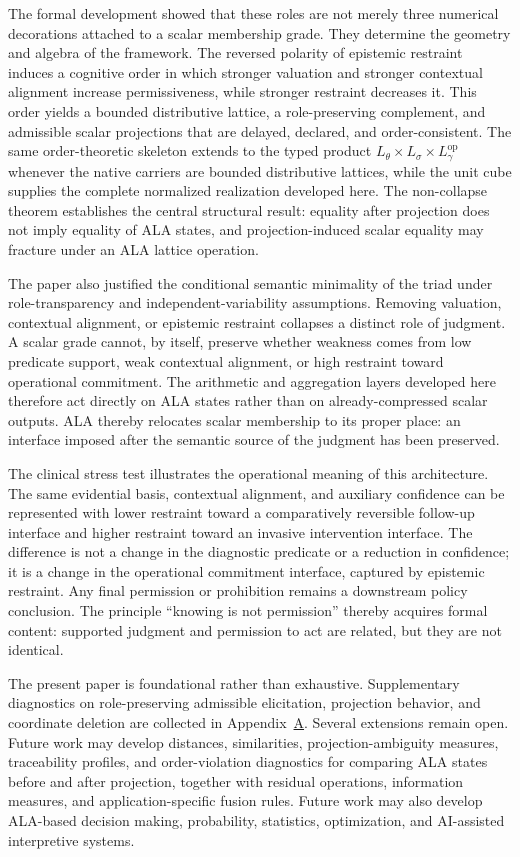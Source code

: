 \documentclass[reqno,final]{amsart}
\theoremstyle{definition}
\theoremstyle{plain}
\theoremstyle{remark}
\begin{document}
The formal development showed that these roles are not merely three numerical decorations attached to a scalar membership grade. They determine the geometry and algebra of the framework. The reversed polarity of epistemic restraint induces a cognitive order in which stronger valuation and stronger contextual alignment increase permissiveness, while stronger restraint decreases it. This order yields a bounded distributive lattice, a role-preserving complement, and admissible scalar projections that are delayed, declared, and order-consistent. The same order-theoretic skeleton extends to the typed product \(L_\theta\times L_\sigma\times L_\gamma^{\mathrm{op}}\) whenever the native carriers are bounded distributive lattices, while the unit cube supplies the complete normalized realization developed here. The non-collapse theorem establishes the central structural result: equality after projection does not imply equality of ALA states, and projection-induced scalar equality may fracture under an ALA lattice operation.

The paper also justified the conditional semantic minimality of the triad under role-transparency and independent-variability assumptions. Removing valuation, contextual alignment, or epistemic restraint collapses a distinct role of judgment. A scalar grade cannot, by itself, preserve whether weakness comes from low predicate support, weak contextual alignment, or high restraint toward operational commitment. The arithmetic and aggregation layers developed here therefore act directly on ALA states rather than on already-compressed scalar outputs. ALA thereby relocates scalar membership to its proper place: an interface imposed after the semantic source of the judgment has been preserved.

The clinical stress test illustrates the operational meaning of this architecture. The same evidential basis, contextual alignment, and auxiliary confidence can be represented with lower restraint toward a comparatively reversible follow-up interface and higher restraint toward an invasive intervention interface. The difference is not a change in the diagnostic predicate or a reduction in confidence; it is a change in the operational commitment interface, captured by epistemic restraint. Any final permission or prohibition remains a downstream policy conclusion. The principle ``knowing is not permission'' thereby acquires formal content: supported judgment and permission to act are related, but they are not identical.

The present paper is foundational rather than exhaustive. Supplementary diagnostics on role-preserving admissible elicitation, projection behavior, and coordinate deletion are collected in Appendix~\hyperref[app:diagnostic-details]{A}. Several extensions remain open. Future work may develop distances, similarities, projection-ambiguity measures, traceability profiles, and order-violation diagnostics for comparing ALA states before and after projection, together with residual operations, information measures, and application-specific fusion rules. Future work may also develop ALA-based decision making, probability, statistics, optimization, and AI-assisted interpretive systems.
\end{document}
